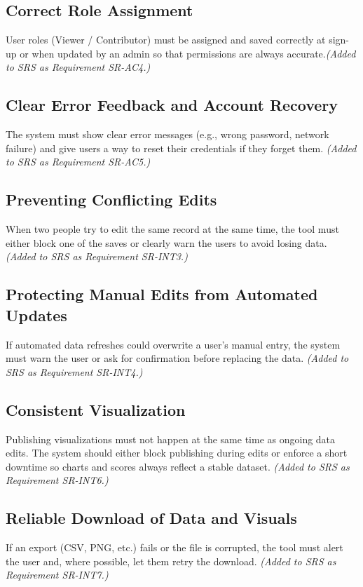 \documentclass{article}
\begin{document}
\subsection*{Correct Role Assignment}
User roles (Viewer / Contributor) must be assigned and saved correctly at sign-up or when updated by an admin so that permissions are always accurate.\textit{(Added to SRS as Requirement SR-AC4.)}

\subsection*{Clear Error Feedback and Account Recovery}
The system must show clear error messages (e.g., wrong password, network failure) and give users a way to reset their credentials if they forget them. \textit{(Added to SRS as Requirement SR-AC5.)}

\subsection*{Preventing Conflicting Edits}
When two people try to edit the same record at the same time, the tool must either block one of the saves or clearly warn the users to avoid losing data. \textit{(Added to SRS as Requirement SR-INT3.)}

\subsection*{Protecting Manual Edits from Automated Updates}
If automated data refreshes could overwrite a user’s manual entry, the system must warn the user or ask for confirmation before replacing the data. \textit{(Added to SRS as Requirement SR-INT4.)}


\subsection*{Consistent Visualization}
Publishing visualizations must not happen at the same time as ongoing data edits.
The system should either block publishing during edits or enforce a short downtime so charts and scores always reflect a stable dataset. \textit{(Added to SRS as Requirement SR-INT6.)}

\subsection*{Reliable Download of Data and Visuals}
If an export (CSV, PNG, etc.) fails or the file is corrupted, the tool must alert the user and, where possible, let them retry the download. \textit{(Added to SRS as Requirement SR-INT7.)}
\end{document}
